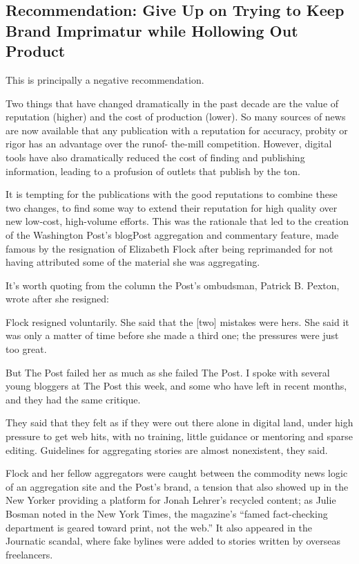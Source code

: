 \subsection{Recommendation: Give Up on Trying to Keep Brand Imprimatur while
Hollowing Out Product}

This is principally a negative recommendation.

Two things that have changed dramatically in the past decade are the
value of reputation (higher) and the cost of production (lower). So
many sources of news are now available that any publication with a
reputation for accuracy, probity or rigor has an advantage over the runof-
the-mill competition. However, digital tools have also dramatically
reduced the cost of finding and publishing information, leading to a
profusion of outlets that publish by the ton.

It is tempting for the publications with the good reputations to combine
these two changes, to find some way to extend their reputation
for high quality over new low-cost, high-volume efforts. This was the
rationale that led to the creation of the Washington Post’s blogPost aggregation
and commentary feature, made famous by the resignation of
Elizabeth Flock after being reprimanded for not having attributed some
of the material she was aggregating.

It’s worth quoting from the column the Post’s ombudsman, Patrick B.
Pexton, wrote after she resigned:

Flock resigned voluntarily. She said that the [two] mistakes were
hers. She said it was only a matter of time before she made a third
one; the pressures were just too great.

But The Post failed her as much as she failed The Post. I spoke with
several young bloggers at The Post this week, and some who have
left in recent months, and they had the same critique.

They said that they felt as if they were out there alone in digital
land, under high pressure to get web hits, with no training, little
guidance or mentoring and sparse editing. Guidelines for aggregating
stories are almost nonexistent, they said.

Flock and her fellow aggregators were caught between the commodity
news logic of an aggregation site and the Post’s brand, a tension that
also showed up in the New Yorker providing a platform for Jonah Lehrer’s
recycled content; as Julie Bosman noted in the New York Times,
the magazine’s ``famed fact-checking department is geared toward print,
not the web.'' It also appeared in the Journatic scandal, where fake bylines
were added to stories written by overseas freelancers.


